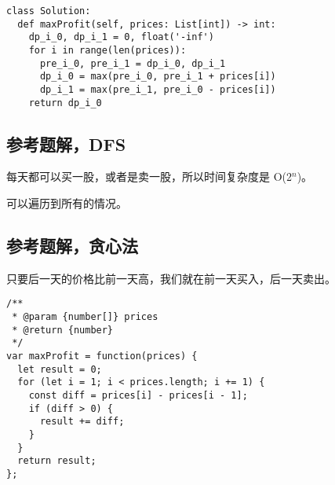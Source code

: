 \begin{verbatim}
class Solution:
  def maxProfit(self, prices: List[int]) -> int:
    dp_i_0, dp_i_1 = 0, float('-inf')
    for i in range(len(prices)):
      pre_i_0, pre_i_1 = dp_i_0, dp_i_1
      dp_i_0 = max(pre_i_0, pre_i_1 + prices[i])
      dp_i_1 = max(pre_i_1, pre_i_0 - prices[i])
    return dp_i_0
\end{verbatim}

\subsection{参考题解，DFS}

每天都可以买一股，或者是卖一股，所以时间复杂度是 O(2$^{n}$)。

可以遍历到所有的情况。

\subsection{参考题解，贪心法}

只要后一天的价格比前一天高，我们就在前一天买入，后一天卖出。

\begin{verbatim}
/**
 * @param {number[]} prices
 * @return {number}
 */
var maxProfit = function(prices) {
  let result = 0;
  for (let i = 1; i < prices.length; i += 1) {
    const diff = prices[i] - prices[i - 1];
    if (diff > 0) {
      result += diff;
    }
  }
  return result;
};
\end{verbatim}
